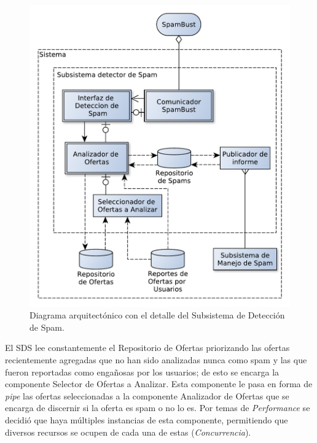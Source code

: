 \begin{figure}[H]
	\centering
	\includegraphics[width=\textwidth]{graficos/arch/Sistema_deteccion_spam.pdf}
	\caption{Diagrama arquitectónico con el detalle del \textsf{Subsistema de Detección de Spam}.}
\end{figure}

El SDS lee constantemente el \textsf{Repositorio de Ofertas} priorizando las ofertas recientemente agregadas que no han sido analizadas nunca como spam y las que fueron reportadas como enga\~{n}osas por los usuarios; de esto se encarga la componente \textsf{Selector de Ofertas a Analizar}. Esta componente le pasa en forma de \emph{pipe} las ofertas seleccionadas a la componente \textsf{Analizador de Ofertas} que se encarga de discernir si la oferta es spam o no lo es. Por temas de \emph{Performance} se decidió que haya múltiples instancias de esta componente, permitiendo que diversos recursos se ocupen de cada una de estas (\emph{Concurrencia}).
 \vspace{9pt} 


